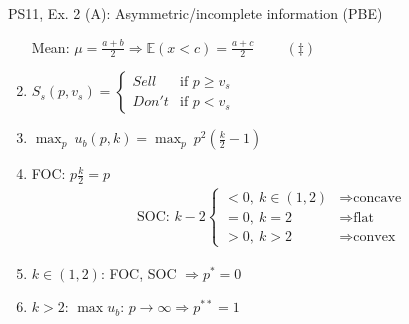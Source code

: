 \begin{frame}{PS11, Ex. 2 (A): Asymmetric/incomplete information (PBE)}
\begin{multicols}{2}
\begin{enumerate}
        \item[Mean:] \vspace{-2pt}  $\mu=\frac{a+b}{2}\Rightarrow\mathbb{E}(x<c)=\frac{a+c}{2}\quad\quad\ (\ddagger)$
        \item \vspace{-2pt} $S_s(p,v_s)=\left\{\begin{array}{ll}
          Sell  & \text{if }p\geq v_s \\
          Don't & \text{if }p < v_s
        \end{array}\right.$
        \item \vspace{-2pt} $\displaystyle{\max_p}\ u_b(p,k)=\displaystyle{\max_p}\ p^2\left(\frac{k}{2}-1\right)$
        \item \vspace{-2pt} FOC: $p\frac{k}{2}=p$\vspace{-6pt}
        \begin{align*}
          \text{SOC: }k-2\left\{\begin{array}{ll}
              <0,\ k\in(1,2)&\Rightarrow\text{concave}\\
              =0,\ k=2&\Rightarrow\text{flat}\\
              >0,\ k>2&\Rightarrow\text{convex}
          \end{array}\right.
        \end{align*}
        \item \vspace{-6pt} $k\in(1,2)$: FOC, SOC $\Rightarrow p^*=0$
        \item \vspace{-2pt} $k>2$: $\max u_b$: $p\rightarrow\infty\Rightarrow p^{**}=1$
      \end{enumerate}
      \vfill\null
    \end{multicols}
\end{frame}
